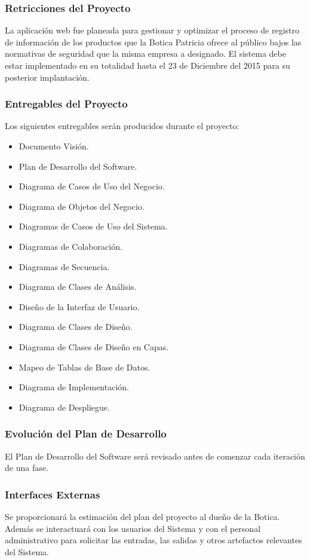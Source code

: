 \documentclass[a4paper,11pt, spanish]{report}
\begin{document}
{{{{{{{{    \subsubsection{Retricciones del Proyecto}
        La aplicación web fue planeada para gestionar y optimizar el proceso de registro de información de los productos que la Botica Patricia ofrece al público bajos las normativas de seguridad que la misma empresa a designado. El sistema debe estar implementado en su totalidad hasta el 23 de Diciembre del 2015 para su posterior implantación.
    \subsubsection{Entregables del Proyecto}
        Los siguientes entregables serán producidos durante el proyecto:
            \begin{itemize}
            \item Documento Visión.
            \item Plan de Desarrollo del Software.
            \item Diagrama de Casos de Uso del Negocio.
            \item Diagrama de Objetos del Negocio.
            \item Diagramas de Casos de Uso del Sistema.
            \item Diagramas de Colaboración.
            \item Diagramas de Secuencia.
            \item Diagrama de Clases de Análisis.
            \item Diseño de la Interfaz de Usuario.
            \item Diagrama de Clases de Diseño.
            \item Diagrama de Clases de Diseño en Capas.
            \item Mapeo de Tablas de Base de Datos.
            \item Diagrama de Implementación.
            \item Diagrama de Despliegue.
            \end {itemize}
    \subsubsection{Evolución del Plan de Desarrollo}
        El Plan de Desarrollo del Software será revisado antes de comenzar cada iteración de una fase.
    \subsubsection{Interfaces Externas}
        Se proporcionará la estimación del plan del proyecto al dueño de la Botica. Además se interactuará con los usuarios del Sistema y con el personal administrativo para solicitar las entradas, las salidas y otros artefactos relevantes del Sistema. 
}}}}}}}}
\end{document}
